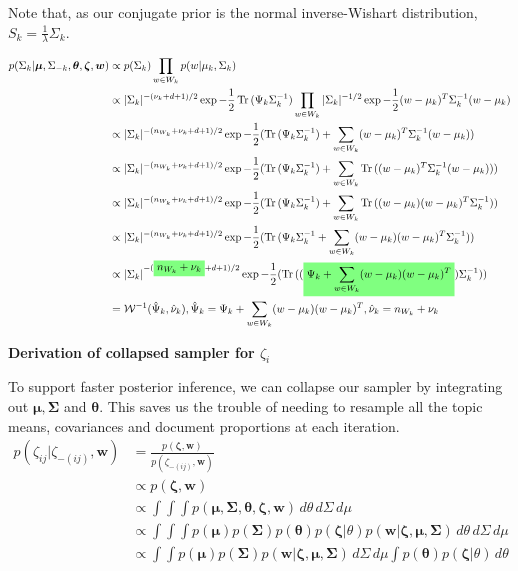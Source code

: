 \documentclass[12pt]{article}
\newcommand{\ghighlight}[1]{%
  \colorbox{green!50}{$\displaystyle#1$}}
\DeclareMathOperator{\Tr}{Tr}
\begin{document}
Note that, as our conjugate prior is the normal inverse-Wishart distribution, $S_k = \frac{1}{\lambda}\Sigma_k$.

\begin{align*}
p(\Sigma_k | \bm{\mu}, \Sigma_{-k}, \bm{\theta}, \bm{\zeta}, \bm{w}) & \propto p(\Sigma_k) \prod_{w \in W_k} p(w | \mu_k, \Sigma_k) \\
& \propto |\Sigma_k|^{-(\nu_k + d + 1)/2} \exp{-\frac{1}{2} \Tr{(\Psi_k\Sigma_k^{-1})}}\prod_{w \in W_k} |\Sigma_k|^{-1/2} \exp{-\frac{1}{2}(w - \mu_k)^T\Sigma_k^{-1}(w - \mu_k)} \\
& \propto |\Sigma_k|^{-(n_{W_k} + \nu_k + d + 1)/2} \exp{-\frac{1}{2} (\Tr{(\Psi_k\Sigma_k^{-1})} + \sum_{w \in W_k} (w - \mu_k)^T\Sigma_k^{-1}(w - \mu_k))} \\
& \propto |\Sigma_k|^{-(n_{W_k} + \nu_k + d + 1)/2} \exp{-\frac{1}{2} (\Tr{(\Psi_k\Sigma_k^{-1})} + \sum_{w \in W_k} \Tr{((w - \mu_k)^T\Sigma_k^{-1}(w - \mu_k))})} \\
& \propto |\Sigma_k|^{-(n_{W_k} + \nu_k + d + 1)/2} \exp{-\frac{1}{2} (\Tr{(\Psi_k\Sigma_k^{-1})} + \sum_{w \in W_k} \Tr{((w - \mu_k)(w - \mu_k)^T\Sigma_k^{-1})})} \\
& \propto |\Sigma_k|^{-(n_{W_k} + \nu_k + d + 1)/2} \exp{-\frac{1}{2} (\Tr{(\Psi_k\Sigma_k^{-1} + \sum_{w \in W_k} (w - \mu_k)(w - \mu_k)^T\Sigma_k^{-1})})} \\
& \propto |\Sigma_k|^{-(\ghighlight{n_{W_k} + \nu_k} + d + 1)/2} \exp{-\frac{1}{2} (\Tr{((\ghighlight{\Psi_k + \sum_{w \in W_k} (w - \mu_k)(w - \mu_k)^T})\Sigma_k^{-1})})} \\
& = \mathcal{W}^{-1}(\hat{\Psi}_k, \hat{\nu}_k), \hat{\Psi}_k = \Psi_k + \sum_{w \in W_k} (w - \mu_k)(w - \mu_k)^T, \hat{\nu}_k = n_{W_k} + \nu_k 
\end{align*}

\textbf{Derivation of collapsed sampler for $\zeta_{i}$}

To support faster posterior inference, we can collapse our sampler by integrating out $\bm{\mu}, \bm{\Sigma}$ and $\bm{\theta}$.  This saves us the trouble of needing to resample all the topic means, covariances and document proportions at each iteration.
\begin{align*}
p(\zeta_{ij} | \zeta_{-(ij)}, \bm{w}) & = \frac{p(\bm{\zeta}, \bm{w})}{p(\zeta_{-(ij)}, \bm{w})} \\
& \propto p(\bm{\zeta}, \bm{w}) \\
& \propto \int \int \int p(\bm{\mu}, \bm{\Sigma}, \bm{\theta}, \bm{\zeta}, \bm{w}) \,d\theta \,d\Sigma \,d\mu \\
& \propto \int \int \int p(\bm{\mu})p(\bm{\Sigma})p(\bm{\theta})p(\bm{\zeta} | \theta)p(\bm{w} | \bm{\zeta}, \bm{\mu}, \bm{\Sigma}) \,d\theta \,d\Sigma \,d\mu \\
& \propto \int \int p(\bm{\mu})p(\bm{\Sigma})p(\bm{w} | \bm{\zeta}, \bm{\mu}, \bm{\Sigma})\,d\Sigma \,d\mu \int p(\bm{\theta})p(\bm{\zeta} | \theta) \,d\theta 
\end{align*}
\end{document}
